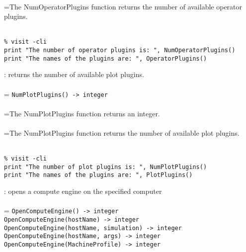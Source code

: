 \documentclass[10pt,a4paper]{report}
\begin{document}
 \\ 
\hangindent=\parindent The NumOperatorPlugins function returns the number of available operator plugins. \\[-3mm] 

\\[-6mm]
\begin{verbatim}% visit -cli
print "The number of operator plugins is: ", NumOperatorPlugins()
print "The names of the plugins are: ", OperatorPlugins()
\end{verbatim}
\newpage


{}
: returns the number of available plot plugins.\\[-3mm]

 \\ 
\hangindent=\parindent 
\verb!NumPlotPlugins() -> integer!\\ [-3mm]

 \\ 
\hangindent=\parindent The NumPlotPlugins function returns an integer. \\[-3mm] 

 \\ 
\hangindent=\parindent The NumPlotPlugins function returns the number of available plot plugins. \\[-3mm] 

\\[-6mm]
\begin{verbatim}% visit -cli
print "The number of plot plugins is: ", NumPlotPlugins()
print "The names of the plugins are: ", PlotPlugins()
\end{verbatim}
\newpage


{}
: opens a compute engine on the specified computer\\[-3mm]

 \\ 
\hangindent=\parindent 
\verb!OpenComputeEngine() -> integer!\\ 
\verb!OpenComputeEngine(hostName) -> integer!\\ 
\verb!OpenComputeEngine(hostName, simulation) -> integer!\\ 
\verb!OpenComputeEngine(hostName, args) -> integer!\\ 
\verb!OpenComputeEngine(MachineProfile) -> integer!\\ [-3mm]
\end{document}
